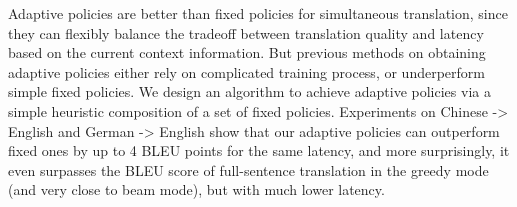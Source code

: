 Adaptive policies are better than fixed policies for simultaneous translation, since they can flexibly balance the tradeoff between translation quality and latency based on the current context information. But previous methods on obtaining adaptive policies either rely on complicated training process, or underperform simple fixed policies. We design an algorithm to achieve adaptive policies via a simple heuristic composition of a set of fixed policies. Experiments on Chinese -> English and German -> English show that our adaptive policies can outperform fixed ones by up to 4 BLEU points for the same latency, and more surprisingly, it even surpasses the BLEU score of full-sentence translation in the greedy mode (and very close to beam mode), but with much lower latency.

